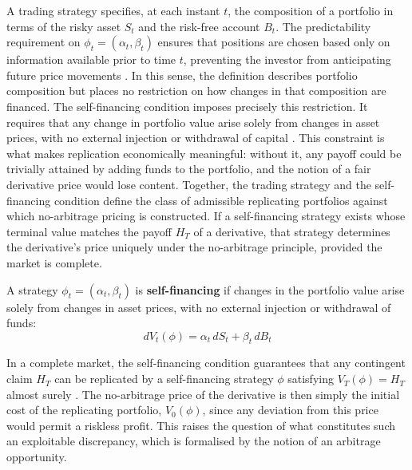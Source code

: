     \noindent
    A trading strategy specifies, at each instant $t$, the composition of a portfolio in terms of the risky asset $S_t$ and the risk-free account $B_t$. The predictability requirement on $\phi_t = (\alpha_t, \beta_t)$ ensures that
    positions are chosen based only on information available prior to time $t$, preventing the investor from anticipating future price movements  \cite{shreve2004stochastic}. In this sense, the definition describes portfolio composition but places no restriction on how changes in that composition are financed. The self-financing condition imposes precisely this restriction. It requires that any change in portfolio value arise solely from changes in asset prices, with no external injection or withdrawal of capital \cite{brigo2001interest}. This constraint is what makes replication economically meaningful: without it, any payoff could be trivially attained by adding funds to the portfolio, and
    the notion of a fair derivative price would lose content. Together, the trading strategy and the self-financing condition define the class of admissible replicating portfolios against which no-arbitrage pricing is constructed. If a self-financing strategy exists whose terminal value matches the payoff $H_T$ of a derivative, that strategy determines the derivative's price uniquely under the no-arbitrage principle, provided the market is complete. 


    \begin{definition}\label{def:self-financing}
        A strategy $\phi_t = (\alpha_t, \beta_t)$ is \textbf{self-financing} if changes in the portfolio value arise solely from changes in asset prices, with no external injection or withdrawal of funds:
        \begin{equation}
            dV_t(\phi) = \alpha_t\,dS_t + \beta_t\,dB_t
        \end{equation}
    \end{definition}

    \noindent
    In a complete market, the self-financing condition guarantees that any contingent claim $H_T$ can be replicated by a self-financing strategy $\phi$ satisfying $V_T(\phi) = H_T$ almost surely \cite{shreve2004stochastic}. The no-arbitrage price of the derivative is then simply the initial cost of the replicating portfolio, $V_0(\phi)$, since any deviation from this price would permit a riskless profit. This raises the question of what constitutes such an exploitable discrepancy, which is formalised by the notion of an arbitrage opportunity. \\

